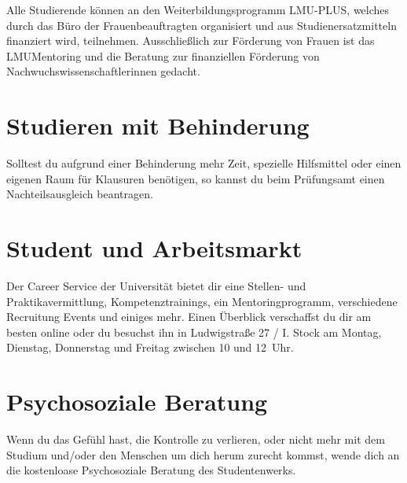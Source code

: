 Alle Studierende können an den Weiterbildungsprogramm LMU-PLUS, welches durch das Büro der Frauenbeauftragten organisiert und aus Studienersatzmitteln finanziert wird, teilnehmen. Ausschließlich zur Förderung von Frauen ist das LMUMentoring und die Beratung zur finanziellen Förderung von Nachwuchswissenschaftlerinnen gedacht.

\begin{urlList}
\end{urlList}


\section{Studieren mit Behinderung}

Solltest du aufgrund einer Behinderung mehr Zeit, spezielle Hilfsmittel oder einen eigenen Raum für Klausuren benötigen, so kannst du beim Prüfungsamt einen Nachteilsausgleich beantragen.

\begin{urlList}
\end{urlList}


\section{Student und Arbeitsmarkt}

Der Career Service der Universität bietet dir eine Stellen- und Praktikavermittlung, Kompetenztrainings, ein Mentoringprogramm, verschiedene Recruitung Events und einiges mehr. Einen Überblick verschaffst du dir am besten online oder du besuchst ihn in Ludwigstraße 27 / I. Stock am Montag, Dienstag, Donnerstag und Freitag zwischen 10 und 12~Uhr.

\begin{urlList}
\end{urlList}


\section{Psychosoziale Beratung}

Wenn du das Gefühl hast, die Kontrolle zu verlieren, oder nicht mehr mit
dem Studium und/oder den Menschen um dich herum zurecht kommst, wende dich an die kostenloase Psychosoziale Beratung des Studentenwerks.

